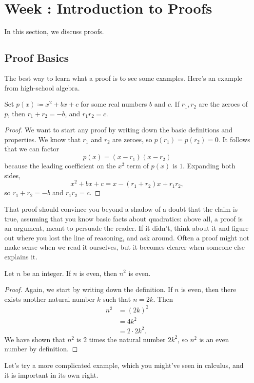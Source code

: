 \documentclass[../notes.tex]{subfiles}
\begin{document}
\section{Week \theweek: Introduction to Proofs}
In this section, we discuss proofs.

\subsection{Proof Basics}
The best way to learn what a proof is to see some examples. Here's an example from high-school algebra.
\begin{example}
    Set $p(x) \coloneqq x^2 + bx + c$ for some real numbers $b$ and $c$. If $r_1,r_2$ are the zeroes of $p$, then $r_1 + r_2 = -b$, and $r_1r_2 = c$.
\end{example}
\begin{proof}
    We want to start any proof by writing down the basic definitions and properties. We know that $r_1$ and $r_2$ are zeroes, so $p(r_1) = p(r_2) = 0$. It follows that we can factor
    \[p(x)=(x-r_1)(x-r_2)\]
    because the leading coefficient on the $x^2$ term of $p(x)$ is $1$. Expanding both sides,
    \[x^2 + bx + c = x - (r_1 + r_2)x + r_1r_2,\]
    so $r_1 + r_2 = -b$ and $r_1r_2 = c$.
\end{proof}
That proof should convince you beyond a shadow of a doubt that the claim is true, assuming that you know basic facts about quadratics: above all, a proof is an argument, meant to persuade the reader. If it didn't, think about it and figure out where you lost the line of reasoning, and ask around. Often a proof might not make sense when we read it ourselves, but it becomes clearer when someone else explains it.
\begin{example} \label{exe:squares-even}
    Let $n$ be an integer. If $n$ is even, then $n^2$ is even.
\end{example}
\begin{proof}
    Again, we start by writing down the definition. If $n$ is even, then there exists another natural number $k$ such that $n = 2k$. Then
    \begin{align*}
        n^2 &= (2k)^2\\
        &= 4k^2\\
        &= 2 \cdot 2k^2.
    \end{align*}
    We have shown that $n^2$ is $2$ times the natural number $2k^2$, so $n^2$ is an even number by definition.
\end{proof}
Let's try a more complicated example, which you might've seen in calculus, and it is important in its own right.
\end{document}
